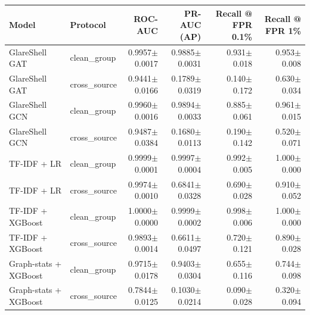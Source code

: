 \begin{tabular}{@{}llrrrr@{}}
\toprule
Model & Protocol & ROC-AUC & PR-AUC (AP) & Recall @ FPR 0.1\% & Recall @ FPR 1\% \\ \midrule
GlareShell GAT & clean\_group & 0.9957$\pm$0.0017 & 0.9885$\pm$0.0031 & 0.931$\pm$0.018 & 0.953$\pm$0.008 \\
GlareShell GAT & cross\_source & 0.9441$\pm$0.0166 & 0.1789$\pm$0.0319 & 0.140$\pm$0.172 & 0.630$\pm$0.034 \\
GlareShell GCN & clean\_group & 0.9960$\pm$0.0016 & 0.9894$\pm$0.0033 & 0.885$\pm$0.061 & 0.961$\pm$0.015 \\
GlareShell GCN & cross\_source & 0.9487$\pm$0.0384 & 0.1680$\pm$0.0113 & 0.190$\pm$0.142 & 0.520$\pm$0.071 \\
TF-IDF + LR & clean\_group & 0.9999$\pm$0.0001 & 0.9997$\pm$0.0004 & 0.992$\pm$0.005 & 1.000$\pm$0.000 \\
TF-IDF + LR & cross\_source & 0.9974$\pm$0.0010 & 0.6841$\pm$0.0328 & 0.690$\pm$0.028 & 0.910$\pm$0.052 \\
TF-IDF + XGBoost & clean\_group & 1.0000$\pm$0.0000 & 0.9999$\pm$0.0002 & 0.998$\pm$0.006 & 1.000$\pm$0.000 \\
TF-IDF + XGBoost & cross\_source & 0.9893$\pm$0.0014 & 0.6611$\pm$0.0497 & 0.720$\pm$0.121 & 0.890$\pm$0.028 \\
Graph-stats + XGBoost & clean\_group & 0.9715$\pm$0.0178 & 0.9403$\pm$0.0304 & 0.655$\pm$0.116 & 0.744$\pm$0.098 \\
Graph-stats + XGBoost & cross\_source & 0.7844$\pm$0.0125 & 0.1030$\pm$0.0214 & 0.090$\pm$0.028 & 0.320$\pm$0.094 \\
\bottomrule
\end{tabular}
